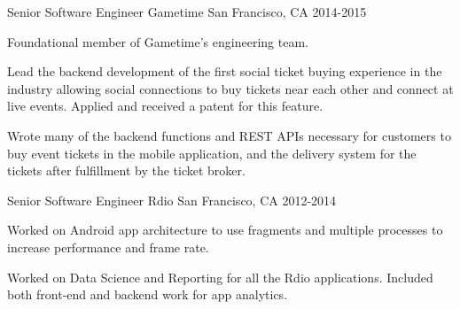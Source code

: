 \begin{cventries}
  \cventry
    {Senior Software Engineer} %
    {Gametime} %
    {San Francisco, CA} %
    {2014-2015} %
    {
      \begin{cvitems} %
        \item {Foundational member of Gametime's engineering team.}
        \item {Lead the backend development of the first social ticket buying experience in the industry allowing social connections to buy tickets near each other and connect at live events. Applied and received a patent for this feature.}
        \item {Wrote many of the backend functions and REST APIs necessary for customers to buy event tickets in the mobile application, and the delivery system for the tickets after fulfillment by the ticket broker.}
      \end{cvitems}
    }

  \cventry
    {Senior Software Engineer} %
    {Rdio} %
    {San Francisco, CA} %
    {2012-2014} %
    {
      \begin{cvitems} %
        \item {Worked on Android app architecture to use fragments and multiple processes to increase performance and frame rate.}
        \item {Worked on Data Science and Reporting for all the Rdio applications. Included both front-end and backend work for app analytics.}
      \end{cvitems}
    }

\end{cventries}
